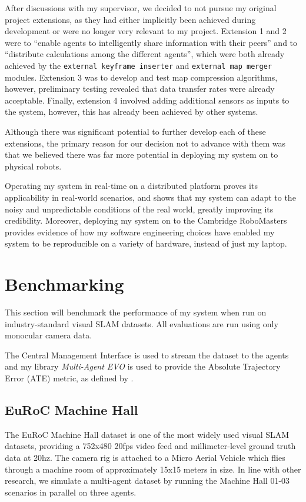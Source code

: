 After discussions with my supervisor, we decided to not pursue my original project extensions, as they had either implicitly been achieved during development or were no longer very relevant to my project. Extension 1 and 2 were to ``enable agents to intelligently share information with their peers'' and to ``distribute calculations among the different agents'', which were both already achieved by the \texttt{external keyframe inserter} and \texttt{external map merger} modules. Extension 3 was to develop and test map compression algorithms, however, preliminary testing revealed that data transfer rates were already acceptable. Finally, extension 4 involved adding additional sensors as inputs to the system, however, this has already been achieved by other systems.

Although there was significant potential to further develop each of these extensions, the primary reason for our decision not to advance with them was that we believed there was far more potential in deploying my system on to physical robots.

Operating my system in real-time on a distributed platform proves its applicability in real-world scenarios, and shows that my system can adapt to the noisy and unpredictable conditions of the real world, greatly improving its credibility. Moreover, deploying my system on to the Cambridge RoboMasters provides evidence of how my software engineering choices have enabled my system to be reproducible on a variety of hardware, instead of just my laptop.

\section{Benchmarking}
\label{sec:benchmarking}
This section will benchmark the performance of my system when run on industry-standard visual SLAM datasets. All evaluations are run using only monocular camera data.

The Central Management Interface is used to stream the dataset to the agents and my library \textit{Multi-Agent EVO} is used to provide the Absolute Trajectory Error (ATE) metric, as defined by \autocite{6385773}.

\subsection{EuRoC Machine Hall}
\label{sec:euroc-machine-hall}
The EuRoC Machine Hall dataset \autocite{burri2016euroc} is one of the most widely used visual SLAM datasets, providing a 752x480 20fps video feed and millimeter-level ground truth data at 20hz. The camera rig is attached to a Micro Aerial Vehicle which flies through a machine room of approximately 15x15 meters in size. In line with other research, we simulate a multi-agent dataset by running the Machine Hall 01-03 scenarios in parallel on three agents.

